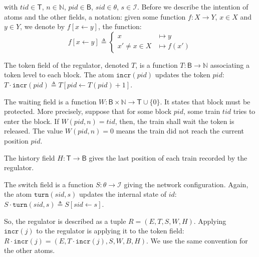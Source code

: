 \documentclass[runningheads]{llncs}
\newcommand{\Nat}{{\mbox{$\mathbb{N}$}}}
\newcommand{\turnouts}{{\mathsf{\theta}}}
\newcommand{\blocks}{{\mathsf{B}}}
\newcommand{\internalState}{{\mathcal{I}}}
\newcommand{\incr}{{\mbox{$\mathtt{incr}$}}\xspace}
\newcommand{\turn}{{\mbox{$\mathtt{turn}$}}\xspace}
\newcommand{\trains}{{\mathsf{T}}}
\begin{document}
\begin{grammar}
    \firstcasesubtil{atom}{\incr(pid)}{}
    \otherform{\turn(sid, s)}{}
 \end{grammar}
with $tid \in \trains$, $n \in  \Nat$, $pid \in \blocks$, $sid \in \turnouts$, $s\in \internalState$.  Before we describe the intention of atoms and the other fields, a notation: given some function $f: X \to Y$, $x \in X$ and $y \in Y$, we denote by $f[x \leftarrow y]$, the function:
 $$f[x \leftarrow y] \triangleq \left\{  \begin{array}{ll} x &\mapsto y\\
x' \neq x \in X &\mapsto f(x')
\end{array}\right.$$

The token field of the regulator, denoted $T$, is a function  $T: \blocks \to \Nat$ associating a token level to each block.  The atom $\incr(pid)$ updates the token $pid$:  $T \cdot \incr(pid)  \triangleq T[pid \leftarrow T(pid)+1]$.

The waiting field is a function $W: \blocks \times \Nat \to \trains \cup \{0\}$. It states that block must be protected. More precisely, suppose that for some block $pid$, some train $tid$ tries to enter the block. If $W(pid,n) = tid$, then, the train shall wait the token is released. The value $W(pid, n) = 0$ means the train did not reach the current position $pid$. 

The history field $H: \trains \to \blocks$ gives the last position of each train recorded  by the regulator. 

The switch field is a function $S: \turnouts \to \internalState$ giving the network configuration. Again, the atom $\turn(sid,s)$ updates the internal state of $id$: $S \cdot \turn(sid,s) \triangleq S[sid \leftarrow s]$. 

So, the regulator is described as a tuple $R = (E, T, S, W, H)$. Applying $\incr(j)$ to the regulator is applying it to the token field: $R \cdot \incr(j) = (E, T \cdot \incr(j), S, W, B, H)$. We use the same convention for the other atoms. 



\end{document}
